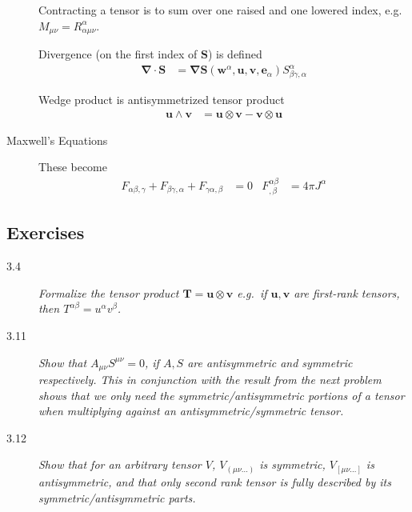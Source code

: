 \documentclass[12pt]{report}
\begin{document}
\begin{description}
        Contracting a tensor is to sum over one raised and one lowered index,
        e.g. $M_{\mu\nu} = R_{\alpha \mu \nu}^\alpha$.

        Divergence (on the first index of $\mathbf{S}$) is defined
        \begin{align}
            \mathbf{\nabla} \cdot \mathbf{S} &= \mathbf{\nabla} \mathbf{S}
                (\mathbf{w}^\alpha, \mathbf{u}, \mathbf{v}, \mathbf{e}_\alpha)
            S^{\alpha}_{\beta\gamma,\alpha}
        \end{align}

        Wedge product is antisymmetrized tensor product
        \begin{align}
            \mathbf{u} \wedge \mathbf{v} &= \mathbf{u} \otimes \mathbf{v} -
                \mathbf{v} \otimes \mathbf{u}
        \end{align}

    \item[Maxwell's Equations] These become
        \begin{align}
            F_{\alpha\beta,\gamma} + F_{\beta\gamma, \alpha} +
            F_{\gamma\alpha,\beta} &= 0 &
            F^{\alpha\beta}_{,\beta} &= 4\pi J^\alpha
        \end{align}
\end{description}

\subsection{Exercises}

\begin{description}
    \item[3.4] \emph{Formalize the tensor product $\mathbf{T} = \mathbf{u}
        \otimes \mathbf{v}$ e.g.\ if $\mathbf{u}, \mathbf{v}$ are first-rank
        tensors, then $T^{\alpha\beta} = u^\alpha v^\beta$.}

    \item[3.11] \emph{Show that $A_{\mu\nu}S^{\mu\nu} = 0$, if $A,S$ are
        antisymmetric and symmetric respectively. This in conjunction with the
        result from the next problem shows that we only need the
        symmetric/antisymmetric portions of a tensor when multiplying against an
        antisymmetric/symmetric tensor.}

    \item[3.12] \emph{Show that for an arbitrary tensor $V$, $V_{(\mu\nu\dots)}$
        is symmetric, $V_{[\mu\nu\dots]}$ is antisymmetric, and that only second
        rank tensor is fully described by its symmetric/antisymmetric parts.}
\end{description}
\end{document}
